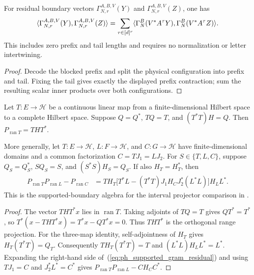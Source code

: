 \begin{lemma}
    \label{thm:residual_boundary_inner_fibers}
    \leanok
    For residual boundary vectors $\Gamma_{N,r}^{A,B,V}(Y)$ and
    $\Gamma_{N,r}^{A,B,V}(Z)$, one has
    \begin{align}
        \langle\Gamma_{N,r}^{A,B,V}(Y),\Gamma_{N,r}^{A,B,V}(Z)\rangle
        =\sum_{\tau\in[d]^r}
        \langle\Gamma_N^B(V^*A^\tau Y),\Gamma_N^B(V^*A^\tau Z)\rangle.
        \notag
    \end{align}
    This includes zero prefix and tail lengths and requires no normalization
    or letter intertwining.
\end{lemma}
\begin{proof}\leanok
    Decode the blocked prefix and split the physical configuration into prefix
    and tail. Fixing the tail gives exactly the displayed prefix contraction;
    sum the resulting scalar inner products over both configurations.
\end{proof}

\begin{lemma}
    \label{thm:supported_gram_projector_cancellation}
    \leanok
    Let $T:E\to\mathcal H$ be a continuous linear map from a finite-dimensional
    Hilbert space to a complete Hilbert space. Suppose $Q=Q^*$, $TQ=T$, and
    $(T^*T)H=Q$. Then $P_{\operatorname{ran}T}=THT^*$.

    More generally, let $T:E\to\mathcal H$, $L:F\to\mathcal H$, and
    $C:G\to\mathcal H$ have finite-dimensional domains and a common
    factorization $C=TJ_1=LJ_2$. For $S\in\{T,L,C\}$, suppose
    $Q_S=Q_S^*$, $SQ_S=S$, and $(S^*S)H_S=Q_S$. If also $H_T=H_T^*$, then
    \begin{align}
        P_{\operatorname{ran}T}P_{\operatorname{ran}L}-P_{\operatorname{ran}C}
         & =TH_T\bigl[T^*L-(T^*T)J_1H_CJ_2^*(L^*L)\bigr]H_LL^*.
        \label{eq:ph_supported_gram_residual}
    \end{align}
    This is the supported-boundary algebra for the interval projector
    comparison in \cite[Lemma~6.1(ii)]{Nachtergaele1996Spectral}.
\end{lemma}
\begin{proof}\leanok
    The vector $THT^*x$ lies in $\operatorname{ran}T$. Taking adjoints of
    $TQ=T$ gives $QT^*=T^*$, so
    $T^*(x-THT^*x)=T^*x-QT^*x=0$. Thus $THT^*$ is the orthogonal range
    projection. For the three-map identity, self-adjointness of $H_T$ gives
    $H_T(T^*T)=Q_T$. Consequently
    $TH_T(T^*T)=T$ and $(L^*L)H_LL^*=L^*$.
    Expanding the right-hand side of~(\ref{eq:ph_supported_gram_residual})
    and using $TJ_1=C$ and $J_2^*L^*=C^*$ gives
    $P_{\operatorname{ran}T}P_{\operatorname{ran}L}-CH_CC^*$.
\end{proof}

